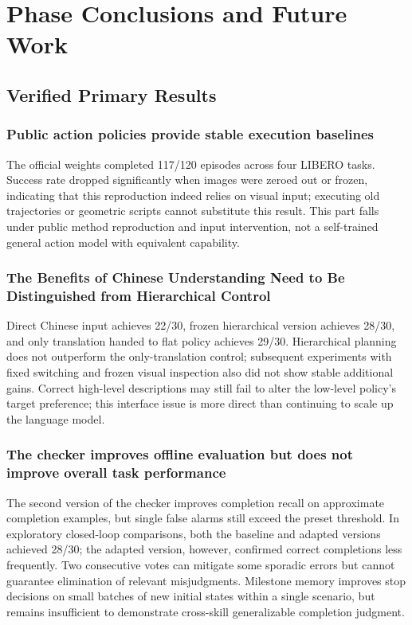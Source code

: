 \chapter{Phase Conclusions and Future Work}
\section{Verified Primary Results}
\subsection{Public action policies provide stable execution baselines}
The official \pifive{} weights completed 117/120 episodes across four LIBERO tasks. Success rate dropped significantly when images were zeroed out or frozen, indicating that this reproduction indeed relies on visual input; executing old trajectories or geometric scripts cannot substitute this result. This part falls under public method reproduction and input intervention, not a self-trained general action model with equivalent capability.
\subsection{The Benefits of Chinese Understanding Need to Be Distinguished from Hierarchical Control}
Direct Chinese input achieves 22/30, frozen hierarchical version achieves 28/30, and only translation handed to flat policy achieves 29/30. Hierarchical planning does not outperform the only-translation control; subsequent experiments with fixed switching and frozen visual inspection also did not show stable additional gains. Correct high-level descriptions may still fail to alter the low-level policy's target preference; this interface issue is more direct than continuing to scale up the language model.
\subsection{The checker improves offline evaluation but does not improve overall task performance}
The second version of the checker improves completion recall on approximate completion examples, but single false alarms still exceed the preset threshold. In exploratory closed-loop comparisons, both the baseline and adapted versions achieved 28/30; the adapted version, however, confirmed correct completions less frequently. Two consecutive votes can mitigate some sporadic errors but cannot guarantee elimination of relevant misjudgments. Milestone memory improves stop decisions on small batches of new initial states within a single scenario, but remains insufficient to demonstrate cross-skill generalizable completion judgment.

